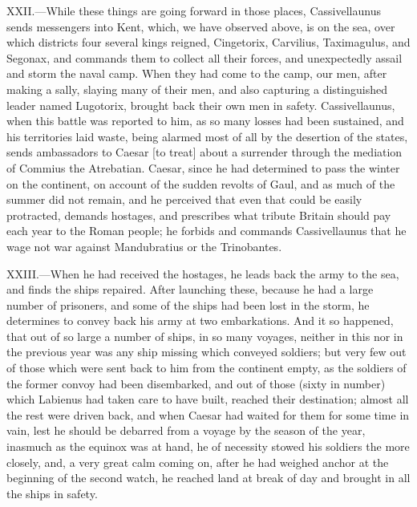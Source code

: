 XXII.—While these things are going forward in those places,
Cassivellaunus sends messengers into Kent, which, we have observed
above, is on the sea, over which districts four several kings reigned,
Cingetorix, Carvilius, Taximagulus, and Segonax, and commands them to
collect all their forces, and unexpectedly assail and storm the naval
camp. When they had come to the camp, our men, after making a sally,
slaying many of their men, and also capturing a distinguished leader
named Lugotorix, brought back their own men in safety. Cassivellaunus,
when this battle was reported to him, as so many losses had been
sustained, and his territories laid waste, being alarmed most of all by
the desertion of the states, sends ambassadors to Caesar [to treat]
about a surrender through the mediation of Commius the Atrebatian.
Caesar, since he had determined to pass the winter on the continent, on
account of the sudden revolts of Gaul, and as much of the summer did not
remain, and he perceived that even that could be easily protracted,
demands hostages, and prescribes what tribute Britain should pay each
year to the Roman people; he forbids and commands Cassivellaunus that he
wage not war against Mandubratius or the Trinobantes.

XXIII.—When he had received the hostages, he leads back the army to the
sea, and finds the ships repaired. After launching these, because he had
a large number of prisoners, and some of the ships had been lost in the
storm, he determines to convey back his army at two embarkations. And it
so happened, that out of so large a number of ships, in so many voyages,
neither in this nor in the previous year was any ship missing which
conveyed soldiers; but very few out of those which were sent back to him
from the continent empty, as the soldiers of the former convoy had been
disembarked, and out of those (sixty in number) which Labienus had taken
care to have built, reached their destination; almost all the rest were
driven back, and when Caesar had waited for them for some time in vain,
lest he should be debarred from a voyage by the season of the year,
inasmuch as the equinox was at hand, he of necessity stowed his soldiers
the more closely, and, a very great calm coming on, after he had weighed
anchor at the beginning of the second watch, he reached land at break of
day and brought in all the ships in safety.

